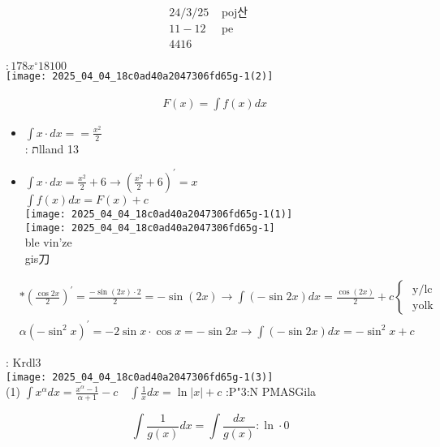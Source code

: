 \documentclass[10pt]{article}
\begin{document}
$$
\begin{array}{cc}
24 / 3 / 25 & \text { poj산 } \\
11-12 & \text { pe } \\
4416 &
\end{array}
$$

$: 178 x^{\circ} 18100$\\
\texttt{[image: 2025\_04\_04\_18c0ad40a2047306fd65g-1(2)]}

$$
\begin{aligned}
& F(x)=\int f(x) d x
\end{aligned}
$$

\begin{itemize}
  \item $\int x \cdot d x==\frac{x^{2}}{2}$\\
: תlland 13
  \item $\int x \cdot d x=\frac{x^{2}}{2}+6 \rightarrow\left(\frac{x^{2}}{2}+6\right)^{\prime}=x$\\
$\int f(x) d x=F(x)+c$\\
\texttt{[image: 2025\_04\_04\_18c0ad40a2047306fd65g-1(1)]}\\
\texttt{[image: 2025\_04\_04\_18c0ad40a2047306fd65g-1]}\\
ble vin'ze\\
gis刀
\end{itemize}

$$
\begin{aligned}
& *\left(\frac{\cos 2 x}{2}\right)^{\prime}=\frac{-\sin (2 x) \cdot 2}{2}=-\sin (2 x) \rightarrow \int(-\sin 2 x) d x=\frac{\cos (2 x)}{2}+c\left\{\begin{array}{l}
\text { y/lc } \\
\text { yolk }
\end{array}\right. \\
& \alpha\left(-\sin ^{2} x\right)^{\prime}=-2 \sin x \cdot \cos x=-\sin 2 x \rightarrow \int(-\sin 2 x) d x=-\sin ^{2} x+c
\end{aligned}
$$

: Krdl3\\
\texttt{[image: 2025\_04\_04\_18c0ad40a2047306fd65g-1(3)]}\\
(1) $\int x^{\alpha} d x=\frac{x^{\alpha}-1}{\alpha+1}-c \quad \int \frac{1}{x} d x=\ln |x|+c$ :P"3:N PMASGila

$$
\int \frac{1}{g(x)} d x=\int \frac{d x}{g(x)}: \ln \cdot 0
$$
\end{document}

